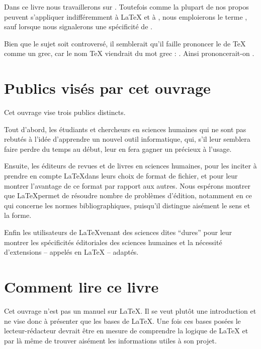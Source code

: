Dans  ce livre nous travaillerons sur \XeLaTeX{}. Toutefois comme la plupart de nos propos peuvent s'appliquer indifféremment  à \LaTeX{} et à \XeLaTeX{}, nous emploierons
le terme \forme{\LaTeX{}}, sauf lorsque nous signalerons une spécificité de \XeLaTeX{}.

\begin{plusloins}
Bien que le sujet soit controversé, il semblerait qu'il faille prononcer le   de \TeX{} comme un  grec, car le nom \TeX{} viendrait du mot grec  : . Ainsi prononcerait-on .
\end{plusloins}


\section{Publics visés par cet ouvrage}

Cet ouvrage vise  trois publics distincts.

Tout d'abord, les étudiants et chercheurs en sciences humaines qui ne sont pas rebutés à l'idée d'apprendre un nouvel outil informatique, qui, s'il leur semblera faire perdre du temps au début, leur en fera gagner un précieux  à l'usage.

Ensuite, les éditeurs de revues et de livres en sciences humaines, pour les inciter à prendre en compte \LaTeX dans leurs choix de format de fichier, et pour leur montrer l'avantage de ce format par rapport aux autres. Nous espérons montrer que \LaTeX permet de résoudre nombre de problèmes d'édition, notamment en ce qui concerne les normes bibliographiques, puisqu'il distingue aisément le sens et la forme.

Enfin les utilisateurs de \LaTeX venant des sciences dites \enquote{dures} pour leur montrer les spécificités éditoriales des sciences humaines et la nécessité d'extensions -- appelés  en \LaTeX{} -- adaptés.


\section{Comment lire ce livre}

Cet ouvrage n'est pas un manuel sur \LaTeX{}. Il se veut plutôt une introduction et ne vise donc à présenter que les bases de \LaTeX{}. Une fois ces bases posées le lecteur-rédacteur devrait être en mesure de comprendre la logique de \LaTeX{} et par là même de trouver aisément les informations utiles à son projet.

